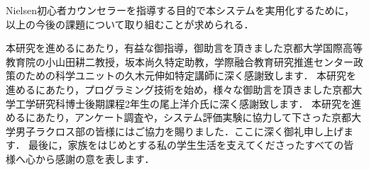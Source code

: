 \documentclass[shuuron]{kuee}
\begin{document}
Nielsen初心者カウンセラーを指導する目的で本システムを実用化するために，以上の今後の課題について取り組むことが求められる．%



\begin{acknowledgements}
	本研究を進めるにあたり，有益な御指導，御助言を頂きました京都大学国際高等教育院の小山田耕二教授，坂本尚久特定助教，学際融合教育研究推進センター政策のための科学ユニットの久木元伸如特定講師に深く感謝致します．
	本研究を進めるにあたり，プログラミング技術を始め，様々な御助言を頂きました京都大学工学研究科博士後期課程2年生の尾上洋介氏に深く感謝致します．
	本研究を進めるにあたり，アンケート調査や，システム評価実験に協力して下さった京都大学男子ラクロス部の皆様にはご協力を賜りました．ここに深く御礼申し上げます．
	最後に，家族をはじめとする私の学生生活を支えてくださったすべての皆様へ心から感謝の意を表します．
\end{acknowledgements}








\appendix
\end{document}
